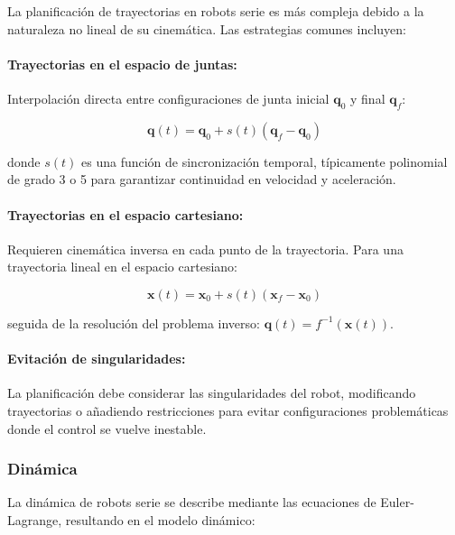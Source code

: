 La planificación de trayectorias en robots serie es más compleja debido a la naturaleza no lineal de su cinemática. Las estrategias comunes incluyen:

\paragraph{Trayectorias en el espacio de juntas:}

Interpolación directa entre configuraciones de junta inicial $\mathbf{q}_0$ y final $\mathbf{q}_f$:

\begin{equation}
\mathbf{q}(t) = \mathbf{q}_0 + s(t)(\mathbf{q}_f - \mathbf{q}_0)
\end{equation}

donde $s(t)$ es una función de sincronización temporal, típicamente polinomial de grado 3 o 5 para garantizar continuidad en velocidad y aceleración.

\paragraph{Trayectorias en el espacio cartesiano:}

Requieren cinemática inversa en cada punto de la trayectoria. Para una trayectoria lineal en el espacio cartesiano:

\begin{equation}
\mathbf{x}(t) = \mathbf{x}_0 + s(t)(\mathbf{x}_f - \mathbf{x}_0)
\end{equation}

seguida de la resolución del problema inverso: $\mathbf{q}(t) = f^{-1}(\mathbf{x}(t))$.

\paragraph{Evitación de singularidades:}

La planificación debe considerar las singularidades del robot, modificando trayectorias o añadiendo restricciones para evitar configuraciones problemáticas donde el control se vuelve inestable.

\subsubsection{Dinámica}

La dinámica de robots serie se describe mediante las ecuaciones de Euler-Lagrange, resultando en el modelo dinámico:

